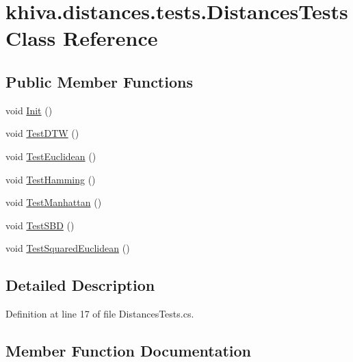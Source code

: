 \hypertarget{classkhiva_1_1distances_1_1tests_1_1_distances_tests}{}\section{khiva.\+distances.\+tests.\+Distances\+Tests Class Reference}
\label{classkhiva_1_1distances_1_1tests_1_1_distances_tests}
\subsection*{Public Member Functions}
\begin{DoxyCompactItemize}
\item 
void \mbox{\hyperlink{classkhiva_1_1distances_1_1tests_1_1_distances_tests_a39925a5af3eeabacdd1e3e2707f2b10b}{Init}} ()
\item 
void \mbox{\hyperlink{classkhiva_1_1distances_1_1tests_1_1_distances_tests_a966328e03e1198c403163365c70b6d70}{Test\+D\+TW}} ()
\item 
void \mbox{\hyperlink{classkhiva_1_1distances_1_1tests_1_1_distances_tests_abe14df3b05c5f701823d65d1714b8796}{Test\+Euclidean}} ()
\item 
void \mbox{\hyperlink{classkhiva_1_1distances_1_1tests_1_1_distances_tests_ac25cb952ae56b6088e4a2217e7dfdb94}{Test\+Hamming}} ()
\item 
void \mbox{\hyperlink{classkhiva_1_1distances_1_1tests_1_1_distances_tests_a1a287607f24e252735762262f083bddd}{Test\+Manhattan}} ()
\item 
void \mbox{\hyperlink{classkhiva_1_1distances_1_1tests_1_1_distances_tests_abb9b055483788527ee497347c6dc4060}{Test\+S\+BD}} ()
\item 
void \mbox{\hyperlink{classkhiva_1_1distances_1_1tests_1_1_distances_tests_a4a96ea1742672b33fa95a5dd0c8ab42b}{Test\+Squared\+Euclidean}} ()
\end{DoxyCompactItemize}


\subsection{Detailed Description}


Definition at line 17 of file Distances\+Tests.\+cs.



\subsection{Member Function Documentation}
\mbox{\label{classkhiva_1_1distances_1_1tests_1_1_distances_tests_a39925a5af3eeabacdd1e3e2707f2b10b}} 

